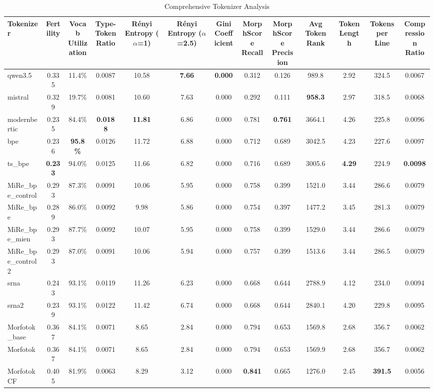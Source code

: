 \begin{table}[htbp]
\centering
\caption{Comprehensive Tokenizer Analysis}
\label{tab:comprehensive_metrics}
\begin{tabular}{lcccccccccccc}
\toprule
Tokenizer & Fertility & \makecell{Vocab \\ Utilization} & \makecell{Type-Token \\ Ratio} & \makecell{Rényi Entropy \\ ($\alpha$=1)} & \makecell{Rényi Entropy \\ ($\alpha$=2.5)} & \makecell{Gini \\ Coefficient} & \makecell{MorphScore \\ Recall} & \makecell{MorphScore \\ Precision} & Avg Token Rank & Token Length & Tokens per Line & \makecell{Compression \\ Ratio} \\
\midrule
qwen3.5 & 0.335 & 11.4\% & 0.0087 & 10.58 & \textbf{7.66} & \textbf{0.000} & 0.312 & 0.126 & 989.8 & 2.92 & 324.5 & 0.0067 \\
mistral & 0.329 & 19.7\% & 0.0081 & 10.60 & 7.63 & 0.000 & 0.292 & 0.111 & \textbf{958.3} & 2.97 & 318.5 & 0.0068 \\
modernbertic & 0.235 & 84.4\% & \textbf{0.0188} & \textbf{11.81} & 6.86 & 0.000 & 0.781 & \textbf{0.761} & 3664.1 & 4.26 & 225.8 & 0.0096 \\
bpe & 0.236 & \textbf{95.8\%} & 0.0126 & 11.72 & 6.88 & 0.000 & 0.712 & 0.689 & 3042.5 & 4.23 & 227.6 & 0.0097 \\
ts\_bpe & \textbf{0.233} & 94.0\% & 0.0125 & 11.66 & 6.82 & 0.000 & 0.716 & 0.689 & 3005.6 & \textbf{4.29} & 224.9 & \textbf{0.0098} \\
MiRe\_bpe\_control & 0.293 & 87.3\% & 0.0091 & 10.06 & 5.95 & 0.000 & 0.758 & 0.399 & 1521.0 & 3.44 & 286.6 & 0.0079 \\
MiRe\_bpe & 0.289 & 86.0\% & 0.0092 & 9.98 & 5.86 & 0.000 & 0.754 & 0.397 & 1477.2 & 3.45 & 281.3 & 0.0079 \\
MiRe\_bpe\_mien & 0.293 & 87.7\% & 0.0092 & 10.07 & 5.95 & 0.000 & 0.758 & 0.399 & 1529.0 & 3.44 & 286.6 & 0.0079 \\
MiRe\_bpe\_control2 & 0.293 & 87.0\% & 0.0091 & 10.06 & 5.94 & 0.000 & 0.757 & 0.399 & 1513.6 & 3.44 & 286.5 & 0.0079 \\
srna & 0.243 & 93.1\% & 0.0119 & 11.26 & 6.23 & 0.000 & 0.668 & 0.644 & 2788.9 & 4.12 & 234.0 & 0.0094 \\
srna2 & 0.239 & 93.1\% & 0.0122 & 11.42 & 6.74 & 0.000 & 0.668 & 0.644 & 2840.1 & 4.20 & 229.8 & 0.0095 \\
Morfotok\_base & 0.367 & 84.1\% & 0.0071 & 8.65 & 2.84 & 0.000 & 0.794 & 0.653 & 1569.8 & 2.68 & 356.7 & 0.0062 \\
Morfotok & 0.367 & 84.1\% & 0.0071 & 8.65 & 2.84 & 0.000 & 0.794 & 0.653 & 1569.9 & 2.68 & 356.7 & 0.0062 \\
MorfotokCF & 0.405 & 81.9\% & 0.0063 & 8.29 & 3.12 & 0.000 & \textbf{0.841} & 0.665 & 1276.0 & 2.45 & \textbf{391.5} & 0.0056 \\
\bottomrule
\end{tabular}
\end{table}